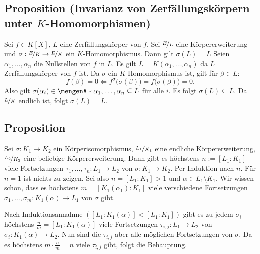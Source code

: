 \subsection{Proposition (Invarianz von Zerfällungskörpern unter $K$-Homomorphismen)} %
\label{sub:1415}
\begin{wrapfigure}[10]{R}[1cm]{3cm}
\end{wrapfigure}
Sei $f \in K[X]$, $L$ eine Zerfällungskörper von $f$. Sei $\nicefrac{E}{L}$ eine Körpererweiterung und $\sigma : \nicefrac{E}{K} \to \nicefrac{E}{K}$ ein 
$K$-Homomorphismus. Dann gilt $\sigma(L)=L$
Seien $\alpha_1, \ldots , \alpha_n$ die Nullstellen von $f$ in $L$. Es gilt $L=K(\alpha_1, \ldots , \alpha_n)$ da $L$ Zerfällungskörper von $f$ ist. Da $\sigma$ ein
$K$-Homomorphismus ist, gilt für $\beta \in L:$ 
\[
	f(\beta)=0 \iff f^\sigma\big(\sigma(\beta)\big)= f\big(\sigma(\beta)\big)=0.
\]
Also gilt $\sigma(\alpha_i) \in \set{\alpha_1, \ldots , \alpha_n} \subseteq L $ für alle $i$. Es folgt $\sigma(L) \subseteq L$. Da $\nicefrac{L}{K}$
endlich ist, folgt $\sigma(L)=L$. \bewende

\subsection[Proposition: Anzahl der Fortsetzungen bei endlichen Körpererweiterungen]{Proposition} %
\label{sub:1416}
Sei $\sigma : K_1 \to K_2$ ein Körperisomorphismus,
 $\nicefrac{L_1}{K_1}$ eine endliche Körpererweiterung, $\nicefrac{L_2}{K_2}$ eine beliebige Körpererweiterung. Dann gibt
es höchstens $n:= [L_1 : K_1]$ viele Fortsetzungen $\tau_1, \ldots ,  \tau_n : L_1 \to L_2$ von $\sigma :K_1 \to K_2$.
Per Induktion nach $n$. Für $n=1$ ist nichts zu zeigen. Sei also $n= [L_1 :K_1] >1$ und $\alpha \in L_1 \setminus K_1$. Wir wissen schon, dass es höchstens 
$m=[K_1(\alpha_1): K_1]$ viele verschiedene Fortsetzungen $\sigma_1, \ldots , \sigma_m : K_1(\alpha) \to L_1$ von $\sigma$ gibt.

Nach Induktionsannahme $([L_1:K_1(\alpha)] < [L_1:K_1])$ gibt es zu jedem $\sigma_i$ höchstens $\frac{n}{m} = [L_1:K_1(\alpha)]$-viele Fortsetzungen $\tau_{i,j} : L_1 \to L_2$
von $\sigma_i :K_1(\alpha) \to L_2$.  Nun sind die $\tau_{i,j}$ aber alle möglichen Fortsetzungen von $\sigma$. Da es höchstens $m \cdot \frac{n}{m}=n $ viele
$\tau_{i,j}$ gibt, folgt die Behauptung. \bewende

